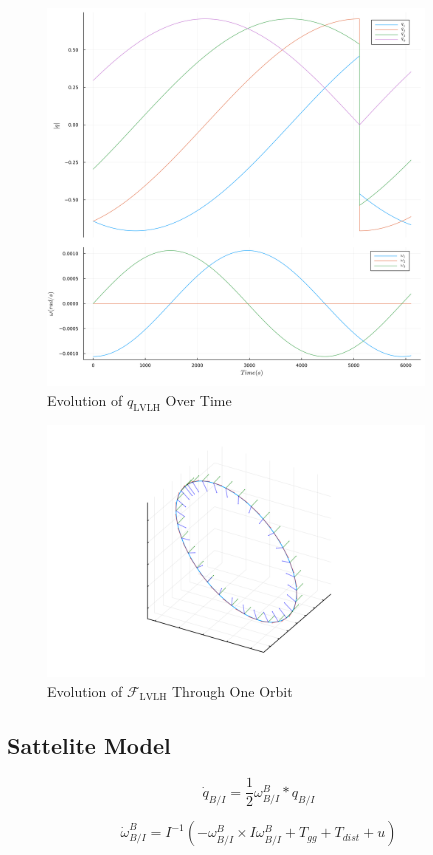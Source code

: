 \documentclass[a4paper]{article}
\begin{document}
\begin{figure}
	\includegraphics[width=10cm]{images/lvlh_attitude.png}
	\caption{Evolution of $q_{\text{LVLH}}$ Over Time}
\end{figure}

\begin{figure}
	\includegraphics[width=10cm]{images/lvlh_orbit_0s_to_6100s.png}
	\caption{Evolution of $\mathcal{F}_{\text{LVLH}}$ Through One Orbit}
\end{figure}

\subsection{Sattelite Model}

\begin{equation}
	\dot{q}_{B/I} = \frac{1}{2} \omega_{B/I}^B * q_{B/I}
	\label{eqn:kin_sat}
\end{equation}

\begin{equation}
	\dot{\omega}_{B/I}^{B} = I^{-1} \left(-\omega_{B/I}^B \times I\omega_{B/I}^B + T_{gg} + T_{dist} + u\right)
	\label{eqn:dyn_sat}
\end{equation}
\end{document}
